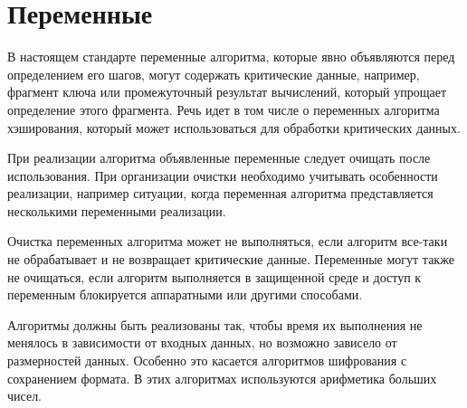 \section{Переменные}\label{COMMON.Vars}

В настоящем стандарте переменные алгоритма, которые явно объявляются перед 
определением его шагов, могут содержать критические данные, например, фрагмент 
ключа или промежуточный результат вычислений, который упрощает определение 
этого фрагмента.
%
Речь идет в том числе о переменных алгоритма хэширования, 
который может использоваться для обработки критических данных.

При реализации алгоритма объявленные переменные следует очищать после
использования. При организации очистки необходимо учитывать особенности
реализации, например ситуации, когда переменная алгоритма представляется
несколькими переменными реализации.

Очистка переменных алгоритма может не выполняться, если алгоритм все-таки 
не обрабатывает и не возвращает критические данные.
%
Переменные могут также не очищаться, если алгоритм выполняется в защищенной 
среде и доступ к переменным блокируется аппаратными или другими способами.

Алгоритмы должны быть реализованы так, чтобы время их выполнения не 
менялось в зависимости от входных данных, но возможно зависело от 
размерностей данных. Особенно это касается алгоритмов шифрования с 
сохранением формата. В этих алгоритмах используются арифметика больших 
чисел.
\fi
